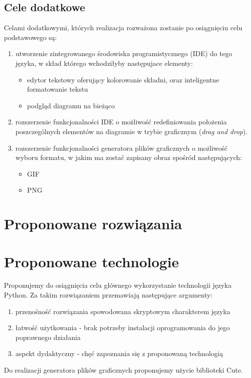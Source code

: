 \documentclass[a4paper,11pt,notitlepage]{article}
\begin{document}
\subsection{Cele dodatkowe}
Celami dodatkowymi, których realizacja rozważona zostanie po osiągnięciu celu podstawowego są:
\begin{enumerate}
  \item{
    utworzenie zintegrowanego środowiska programistycznego (IDE) do tego języka, w skład którego wchodziłyby następujace elementy:
    \begin{itemize}
      \item{edytor tekstowy oferujący kolorowanie składni, oraz inteligentne formatowanie tekstu}
      \item{podgląd diagramu na bieżąco}
    \end{itemize}
  }
  \item{rozszerzenie funkcjonalności IDE o możliwość redefiniowania położenia poszczególnych elementów na diagramie w trybie graficznym (\emph{drag and drop}).}
  \item{rozszerzenie funkcjonalności generatora plików graficznych o możliwość wyboru formatu, w jakim ma zostać zapisany obraz spośród następujących:
    \begin{itemize}
      \item{GIF}
      \item{PNG}
    \end{itemize}
  } %
\end{enumerate}
\section{Proponowane rozwiązania}
\section{Proponowane technologie}
Proponujemy do osiągnięcia celu głównego wykorzystanie technologii języka Python. Za takim rozwiązaniem przemawiają następujące argumenty:
\begin{enumerate}
  \item{przenośność rozwiązania spowodowana skryptowym charakterem języka}
  \item{łatwość użytkowania - brak potrzeby instalacji oprogramowania do jego poprawnego działania}
  \item{aspekt dydaktyczny - chęć zapoznania się z proponowaną technologią}
\end{enumerate}
Do realizacji generatora plików graficznych proponujemy użycie biblioteki Cute.
\end{document}
